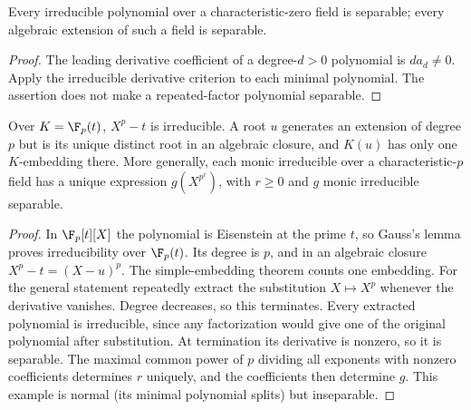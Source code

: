 \begin{corollary}
Every irreducible polynomial over a characteristic-zero field is separable; every algebraic extension of such a field is separable.
\end{corollary}
\begin{proof}
The leading derivative coefficient of a degree-$d>0$ polynomial is $d a_d\ne0$. Apply the irreducible derivative criterion to each minimal polynomial. The assertion does not make a repeated-factor polynomial separable.
\end{proof}

\begin{proposition}
Over $K=\F_p(t)$, $X^p-t$ is irreducible. A root $u$ generates an extension of degree $p$ but is its unique distinct root in an algebraic closure, and $K(u)$ has only one $K$-embedding there. More generally, each monic irreducible over a characteristic-$p$ field has a unique expression $g(X^{p^r})$, with $r\geq0$ and $g$ monic irreducible separable.
\end{proposition}
\begin{proof}
In $\F_p[t][X]$ the polynomial is Eisenstein at the prime $t$, so Gauss's lemma proves irreducibility over $\F_p(t)$. Its degree is $p$, and in an algebraic closure $X^p-t=(X-u)^p$. The simple-embedding theorem counts one embedding. For the general statement repeatedly extract the substitution $X\mapsto X^p$ whenever the derivative vanishes. Degree decreases, so this terminates. Every extracted polynomial is irreducible, since any factorization would give one of the original polynomial after substitution. At termination its derivative is nonzero, so it is separable. The maximal common power of $p$ dividing all exponents with nonzero coefficients determines $r$ uniquely, and the coefficients then determine $g$. This example is normal (its minimal polynomial splits) but inseparable.
\end{proof}

